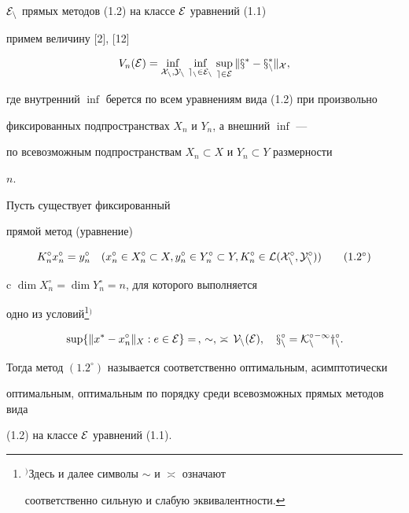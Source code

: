 $\cal E_n$ прямых методов (1.2) на классе $\cal E$ уравнений (1.1)


примем величину [2], [12]


\begin{equation}


V_n(\cal E)=\inf_{\mathstrut X_n, Y_n}\, \inf_{\mathstrut e_n\in \cal E_n}\,


\sup_{e\in \cal E}\|x^*-x_n^*\|_X,


\end{equation}


где внутренний $\inf$ берется по всем уравнениям вида (1.2) при произвольно


фиксированных подпространствах $X_n$ и $Y_n$, а внешний $\inf$ ---


по всевозможным подпространствам $X_n\subset X$ и $Y_n\subset Y$ размерности


$n$.





\begin{defn}


Пусть существует фиксированный


прямой метод (уравнение)


\begin{equation}


K_n^\circ x_n^\circ =y_n^\circ \quad


(x_n^\circ \in X_n^\circ \subset X, y_n^\circ \in Y_n^\circ \subset Y,


K_n^\circ \in \cal L(X_n^\circ ,Y_n^\circ ))


\tag{1.2$^\circ$}


\end{equation}


c $\dim X_n^\circ =\dim Y_n^\circ =n$, для которого выполняется


одно из условий\footnote{$^)$\;Здесь и далее символы $\sim$ и $\asymp$ означают


соответственно сильную и слабую эквивалентности.}$^)$


\begin{equation}


\sup\{ \|x^*-x_n^\circ \|_X : e\in \cal E\} =\, ,\, \sim ,\, \asymp


\, V_n(\cal E),\quad x_n^\circ =K_n^\circ {} ^{-1}y_n^\circ .


\end{equation}


Тогда метод $(1.2^\circ)$ называется соответственно оптимальным, асимптотически


оптимальным, оптимальным по порядку среди всевозможных прямых методов вида


(1.2) на классе $\cal E$ уравнений (1.1).


\end{defn}





